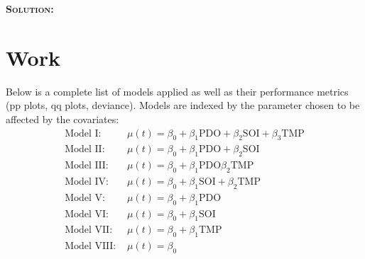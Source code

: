\documentclass[12pt,oneside]{article}
\newenvironment{solution}
    {\textbf{\textsc{Solution:}}\\}
    {\newpage}
\begin{document}
\begin{solution}
\section*{Work}
Below is a complete list of models applied as well as their performance metrics (pp plots, qq plots, deviance). Models are indexed by the parameter chosen to be affected by the covariates:
\begin{align*}
    \text{Model I: }& \mu(t)=\beta_0+\beta_1\text{PDO}+\beta_2\text{SOI}+ \beta_3\text{TMP}\\
    \text{Model II: }& \mu(t)=\beta_0+\beta_1\text{PDO}+\beta_2\text{SOI}\\
    \text{Model III: }& \mu(t)=\beta_0+\beta_1\text{PDO}\beta_2\text{TMP}\\
    \text{Model IV: }& \mu(t)=\beta_0+\beta_1\text{SOI}+ \beta_2\text{TMP}\\
    \text{Model V: }& \mu(t)=\beta_0+\beta_1\text{PDO}\\
    \text{Model VI: }& \mu(t)=\beta_0+\beta_1\text{SOI}\\
    \text{Model VII: }& \mu(t)=\beta_0+\beta_1\text{TMP}\\
    \text{Model VIII: }& \mu(t)=\beta_0
\end{align*}
\end{solution}
\end{document}
